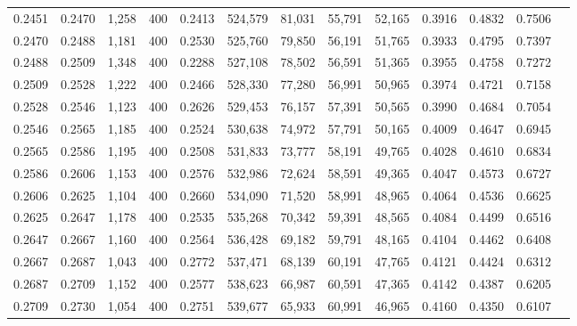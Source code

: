 \begin{tabular}{rrrrrrrrrrrrr}
0.2451 & 0.2470 &  1,258 &   400 &                                     0.2413 & 524,579 &  81,031 &  55,791 &  52,165 & 0.3916 & 0.4832 & 0.7506 \\
0.2470 & 0.2488 &  1,181 &   400 &                                     0.2530 & 525,760 &  79,850 &  56,191 &  51,765 & 0.3933 & 0.4795 & 0.7397 \\
0.2488 & 0.2509 &  1,348 &   400 &                                     0.2288 & 527,108 &  78,502 &  56,591 &  51,365 & 0.3955 & 0.4758 & 0.7272 \\
0.2509 & 0.2528 &  1,222 &   400 &                                     0.2466 & 528,330 &  77,280 &  56,991 &  50,965 & 0.3974 & 0.4721 & 0.7158 \\
0.2528 & 0.2546 &  1,123 &   400 &                                     0.2626 & 529,453 &  76,157 &  57,391 &  50,565 & 0.3990 & 0.4684 & 0.7054 \\
0.2546 & 0.2565 &  1,185 &   400 &                                     0.2524 & 530,638 &  74,972 &  57,791 &  50,165 & 0.4009 & 0.4647 & 0.6945 \\
0.2565 & 0.2586 &  1,195 &   400 &                                     0.2508 & 531,833 &  73,777 &  58,191 &  49,765 & 0.4028 & 0.4610 & 0.6834 \\
0.2586 & 0.2606 &  1,153 &   400 &                                     0.2576 & 532,986 &  72,624 &  58,591 &  49,365 & 0.4047 & 0.4573 & 0.6727 \\
0.2606 & 0.2625 &  1,104 &   400 &                                     0.2660 & 534,090 &  71,520 &  58,991 &  48,965 & 0.4064 & 0.4536 & 0.6625 \\
0.2625 & 0.2647 &  1,178 &   400 &                                     0.2535 & 535,268 &  70,342 &  59,391 &  48,565 & 0.4084 & 0.4499 & 0.6516 \\
0.2647 & 0.2667 &  1,160 &   400 &                                     0.2564 & 536,428 &  69,182 &  59,791 &  48,165 & 0.4104 & 0.4462 & 0.6408 \\
0.2667 & 0.2687 &  1,043 &   400 &                                     0.2772 & 537,471 &  68,139 &  60,191 &  47,765 & 0.4121 & 0.4424 & 0.6312 \\
0.2687 & 0.2709 &  1,152 &   400 &                                     0.2577 & 538,623 &  66,987 &  60,591 &  47,365 & 0.4142 & 0.4387 & 0.6205 \\
0.2709 & 0.2730 &  1,054 &   400 &                                     0.2751 & 539,677 &  65,933 &  60,991 &  46,965 & 0.4160 & 0.4350 & 0.6107 \\

\end{tabular}
